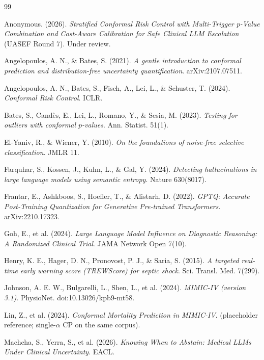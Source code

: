 \documentclass[11pt,letterpaper]{article}
\begin{document}
\begin{thebibliography}{99}
\small

 Anonymous. (2026). \emph{Stratified Conformal Risk
Control with Multi-Trigger p-Value Combination and Cost-Aware Calibration
for Safe Clinical LLM Escalation} (UASEF Round 7). Under review.

 Angelopoulos, A. N., \& Bates, S. (2021).
\emph{A gentle introduction to conformal prediction and distribution-free
uncertainty quantification}. arXiv:2107.07511.

 Angelopoulos, A. N., Bates, S., Fisch, A.,
Lei, L., \& Schuster, T. (2024). \emph{Conformal Risk Control}. ICLR.

 Bates, S., Cand\`es, E., Lei, L., Romano, Y.,
\& Sesia, M. (2023). \emph{Testing for outliers with conformal $p$-values}.
Ann. Statist. 51(1).

 El-Yaniv, R., \& Wiener, Y. (2010). \emph{On
the foundations of noise-free selective classification}. JMLR 11.

 Farquhar, S., Kossen, J., Kuhn, L., \& Gal, Y.
(2024). \emph{Detecting hallucinations in large language models using
semantic entropy}. Nature 630(8017).

 Frantar, E., Ashkboos, S., Hoefler, T., \&
Alistarh, D. (2022). \emph{GPTQ: Accurate Post-Training Quantization for
Generative Pre-trained Transformers}. arXiv:2210.17323.

 Goh, E., et al. (2024). \emph{Large Language Model
Influence on Diagnostic Reasoning: A Randomized Clinical Trial}. JAMA
Network Open 7(10).

 Henry, K. E., Hager, D. N., Pronovost, P. J.,
\& Saria, S. (2015). \emph{A targeted real-time early warning score
(TREWScore) for septic shock}. Sci. Transl. Med. 7(299).

 Johnson, A. E. W., Bulgarelli, L., Shen, L., et al.
(2024). \emph{MIMIC-IV (version 3.1)}. PhysioNet. doi:10.13026/kpb9-mt58.

 Lin, Z., et al. (2024). \emph{Conformal Mortality
Prediction in MIMIC-IV}. (placeholder reference; single-$\alpha$ CP on the
same corpus).

 Machcha, S., Yerra, S., et al. (2026). \emph{Knowing
When to Abstain: Medical LLMs Under Clinical Uncertainty}. EACL.


\end{thebibliography}
\end{document}
